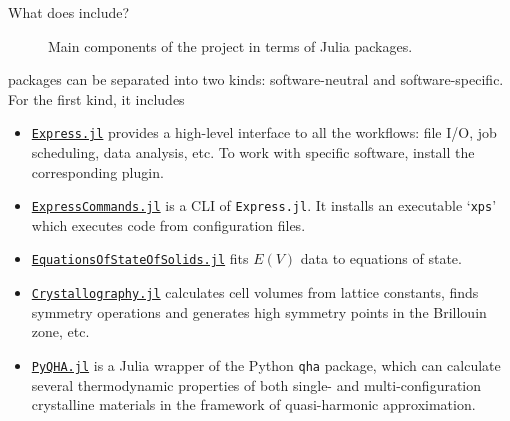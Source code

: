 \begin{frame}[allowframebreaks]{What does \express{} include?}
      \begin{figure}[H]
            \centering
            \caption{Main components of the \express{} project in terms of Julia packages.}
            \label{fig:components}
      \end{figure}

      \framebreak

      \express{} packages can be separated into two kinds: software-neutral and software-specific.
      For the first kind, it includes
            {\footnotesize
                  \begin{itemize}
                        \item \href{https://github.com/MineralsCloud/Express.jl}{\texttt{Express.jl}}
                              provides a high-level interface to all the
                              workflows: file I/O, job scheduling, data analysis, etc.
                              To work with specific software, install the corresponding plugin.
                        \item \href{https://github.com/MineralsCloud/ExpressCommands.jl}{\texttt{ExpressCommands.jl}}
                              is a CLI of \texttt{Express.jl}. It installs an executable
                              `\texttt{xps}' which executes code from configuration files.
                        \item \href{https://github.com/MineralsCloud/EquationsOfStateOfSolids.jl}{\texttt{EquationsOfStateOfSolids.jl}}
                              fits $E(V)$ data to equations of state.
                        \item \href{https://github.com/MineralsCloud/Crystallography.jl}{\texttt{Crystallography.jl}}
                              calculates cell volumes from lattice constants, finds symmetry
                              operations and generates high symmetry points in the Brillouin zone, etc.
                        \item \href{https://github.com/MineralsCloud/PyQHA.jl}{\texttt{PyQHA.jl}}
                              is a Julia wrapper of
                              the Python \texttt{qha} package, which can calculate
                              several thermodynamic properties of both single- and multi-configuration
                              crystalline materials in the framework of quasi-harmonic approximation.

\end{itemize}}
\end{frame}
